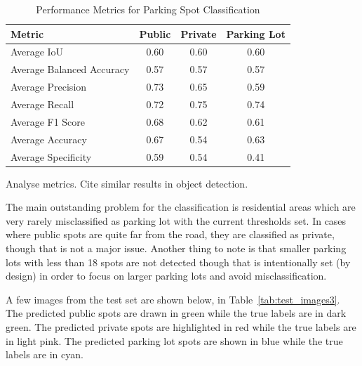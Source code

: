 \begin{table}[htbp]
    \centering
    \begin{tabular}{|l|c|c|c|}
    \hline
    \textbf{Metric}               & \textbf{Public} & \textbf{Private} & \textbf{Parking Lot} \\ \hline
    Average IoU                  & 0.60             & 0.60             & 0.60              \\ \hline
    Average Balanced Accuracy    & 0.57             & 0.57             & 0.57              \\ \hline
    Average Precision            & 0.73             & 0.65             & 0.59              \\ \hline
    Average Recall               & 0.72             & 0.75             & 0.74              \\ \hline
    Average F1 Score             & 0.68             & 0.62             & 0.61              \\ \hline
    Average Accuracy             & 0.67             & 0.54             & 0.63              \\ \hline
    Average Specificity          & 0.59             & 0.54             & 0.41              \\ \hline
    \end{tabular}
    \caption{Performance Metrics for Parking Spot Classification}
    \label{tab:metrics3}
\end{table}

Analyse metrics. Cite similar results in object detection.

The main outstanding problem for the classification is residential areas which are very rarely misclassified as parking lot with the current thresholds set.
In cases where public spots are quite far from the road, they are classified as private, though that is not a major issue.
Another thing to note is that smaller parking lots with less than 18 spots are not detected though that is intentionally set (by design) in order to focus on larger parking lots and avoid misclassification.

A few images from the test set are shown below, in Table~\ref{tab:test_images3}.
The predicted public spots are drawn in green while the true labels are in dark green. The predicted private spots are highlighted in red while the true labels are in light pink. The predicted parking lot spots are shown in blue while the true labels are in cyan.


